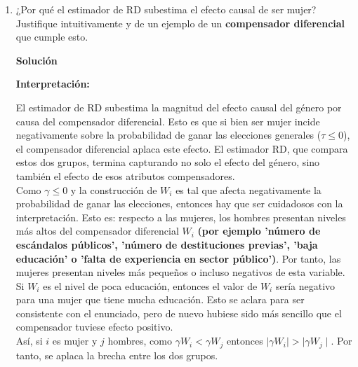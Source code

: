 \documentclass[a4paper, answers, addpoints, 11pt]{exam}
\newenvironment{solucion}{%
  \begin{mdframed}[
    backgroundcolor=blue!5,    %
    linecolor=blue!50,          %
    linewidth=2pt,              %
    leftmargin=10pt,            %
    rightmargin=8pt,           %
    topline=true,              %
    bottomline=true,            %
    roundcorner=10pt,           %
    innerleftmargin=10pt,       %
    innerrightmargin=10pt,      %
    innerbottommargin=10pt,     %
    innertopmargin=10pt         %
  ]%
  \begin{tcolorbox}[colframe=blue!50!black, colback=blue!50, coltitle=white, sharp corners=all, boxrule=1mm, width=\textwidth, halign=left, valign=center, top=0mm, bottom=0mm, left=0mm, right=0mm] \textbf{Solución} \end{tcolorbox} }{\end{mdframed}}
\begin{document}
\begin{enumerate}[resume]
\begin{enumerate}
\begin{solucion}
\begin{mdframed}[backgroundcolor=moraditoClaro]
\begin{proof}
Esta expresión proviene directamente del proyector de mínimos cuadrados de \( W_i - W_j\) sobre \( z \) en el contexto de variables normales multivariadas.  Como \( \mathbb{E}[ W_i - W_j] = 0 , z_0=0 \), la fórmula se reduce a:
\[
\mathbb{E}[ W_i - W_j \mid z = 0] = \frac{\text{Cov}( W_i - W_j, z)}{\text{Var}(z)} (-\mathbb{E}[z])
\]

 \end{proof}

\end{mdframed}
\textcolor{red}{revisar esto}
\end{solucion}
        \item ¿Por qué  el estimador de RD subestima el efecto causal de ser mujer? Justifique intuitivamente y de un ejemplo de un \textbf{compensador diferencial} que cumple esto.
        \begin{solucion}
\textbf{Interpretación:} %

El estimador de RD subestima la magnitud del efecto causal del género por causa del compensador diferencial. Esto es que si bien ser mujer incide negativamente sobre la probabilidad de ganar las elecciones generales ($\tau \leq 0$), el compensador diferencial aplaca este efecto. El estimador RD, que compara estos dos grupos, termina capturando no solo el efecto del género, sino también el efecto de esos atributos compensadores.\\

 Como $\gamma \leq 0$ y la construcción de $W_i$ es tal que afecta negativamente la probabilidad de ganar las elecciones, entonces hay que ser cuidadosos con la interpretación. Esto es:  respecto a las mujeres, los hombres presentan niveles más altos del compensador diferencial $W_i$ \textbf{(por ejemplo 'número de escándalos públicos', 'número de destituciones previas', 'baja educación' o 'falta de experiencia en sector público')}. Por tanto, las mujeres presentan niveles más pequeños o incluso negativos de esta variable. Si $W_i$ es el nivel de poca educación, entonces el valor de $W_i$ sería negativo para una mujer que tiene mucha educación. Esto se aclara para ser consistente con el enunciado, pero de nuevo hubiese sido más sencillo que el compensador tuviese efecto positivo.\\
 
Así, si $i$ es mujer y $j$ hombres, como $\gamma W_i  < \gamma W_j $ entonces $\mid \gamma W_i \mid > \mid \gamma W_j \mid$. Por tanto, se aplaca la brecha entre los dos grupos.  \\


\end{solucion}
\end{enumerate}
\end{enumerate}
\end{document}
